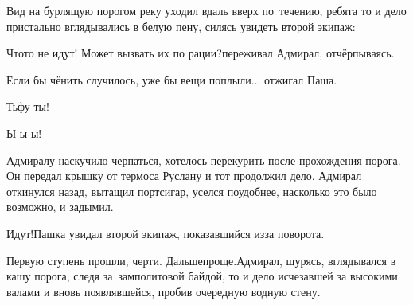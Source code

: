 Вид на бурлящую порогом реку уходил вдаль вверх по~течению, ребята то и дело пристально вглядывались в белую пену, силясь увидеть второй экипаж:

\diagdash Что\sdash то не идут! Может вызвать их по рации?\mdash переживал Адмирал, отчёрпываясь.

\diagdash Если бы чё\sdash нить случилось, уже бы вещи поплыли$\ldots$ \mdash отжигал Паша.

\diagdash Тьфу ты!

\diagdash Ы-ы-ы!

Адмиралу наскучило черпаться, хотелось перекурить после прохождения порога. Он передал крышку от термоса Руслану и тот продолжил дело. Адмирал откинулся назад, вытащил портсигар, уселся поудобнее, насколько это было возможно, и задымил.

\diagdash Идут!\mdash Пашка увидал второй экипаж, показавшийся из\sdash за поворота. 

\diagdash Первую ступень прошли, черти. Дальше\mdash проще.\mdash Адмирал, щурясь, вглядывался в кашу порога, следя за~замполитовой байдой, то и дело исчезавшей за высокими валами и вновь появлявшейся, пробив очередную водную стену.




\begin{center}
\end{center}
